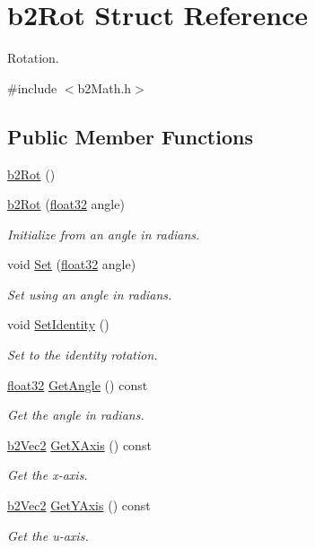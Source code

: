 \hypertarget{structb2_rot}{}\section{b2\+Rot Struct Reference}
\label{structb2_rot}


Rotation.  




{\ttfamily \#include $<$b2\+Math.\+h$>$}

\subsection*{Public Member Functions}
\begin{DoxyCompactItemize}
\item 
\mbox{\hyperlink{structb2_rot_a8cabd61f7e293b67748640fa5aa19841}{b2\+Rot}} ()
\item 
\mbox{\hyperlink{structb2_rot_aa40dda6d390a2f54c793c63027a9b46e}{b2\+Rot}} (\mbox{\hyperlink{b2_settings_8h_aacdc525d6f7bddb3ae95d5c311bd06a1}{float32}} angle)
\begin{DoxyCompactList}\small\item\em Initialize from an angle in radians. \end{DoxyCompactList}\item 
void \mbox{\hyperlink{structb2_rot_acde9186de0a4a7397bf8ef714408ad60}{Set}} (\mbox{\hyperlink{b2_settings_8h_aacdc525d6f7bddb3ae95d5c311bd06a1}{float32}} angle)
\begin{DoxyCompactList}\small\item\em Set using an angle in radians. \end{DoxyCompactList}\item 
void \mbox{\hyperlink{structb2_rot_a7f534cb7ece8d325662d7d0e27d4f617}{Set\+Identity}} ()
\begin{DoxyCompactList}\small\item\em Set to the identity rotation. \end{DoxyCompactList}\item 
\mbox{\hyperlink{b2_settings_8h_aacdc525d6f7bddb3ae95d5c311bd06a1}{float32}} \mbox{\hyperlink{structb2_rot_a45031fccfa11d3b3a09154008ce28b39}{Get\+Angle}} () const
\begin{DoxyCompactList}\small\item\em Get the angle in radians. \end{DoxyCompactList}\item 
\mbox{\hyperlink{structb2_vec2}{b2\+Vec2}} \mbox{\hyperlink{structb2_rot_a952a5555c1f68ce3e39ac992fcf4eba9}{Get\+X\+Axis}} () const
\begin{DoxyCompactList}\small\item\em Get the x-\/axis. \end{DoxyCompactList}\item 
\mbox{\hyperlink{structb2_vec2}{b2\+Vec2}} \mbox{\hyperlink{structb2_rot_ab057c4e9dc821099949391a6ded36dd6}{Get\+Y\+Axis}} () const
\begin{DoxyCompactList}\small\item\em Get the u-\/axis. \end{DoxyCompactList}\end{DoxyCompactItemize}
